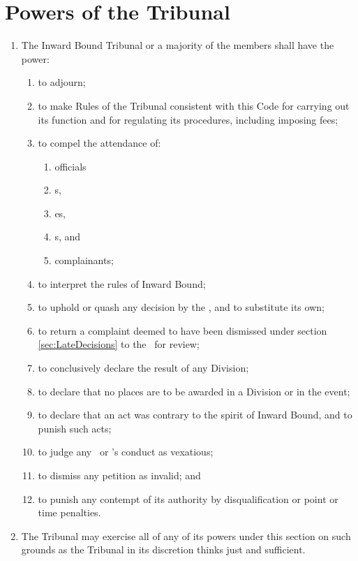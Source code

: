 \documentclass[12pt]{report}
\begin{document}
  \section{Powers of the Tribunal}\label{sec:TribunalPowers}
  \begin{enumerate}
    \item The Inward Bound Tribunal or a majority of the members shall have the power:
    \begin{enumerate}
      \item to adjourn;
      \item to make Rules of the Tribunal consistent with this Code for carrying out its function and for regulating its procedures, including imposing  fees;
      \item to compel the attendance of:
      \begin{enumerate}
        \item officials
        \item \competitor s,
        \item \Captain es,
        \item \President s, and
        \item complainants;
      \end{enumerate}
      \item to interpret the rules of Inward Bound;
      \item to uphold or quash any decision by the \Referee, and to substitute its own;
      \item to return a complaint deemed to have been dismissed under section \ref{sec:LateDecisions} to the \Referee\ for review;
      \item to conclusively declare the result of any Division;
      \item to declare that no places are to be awarded in a Division or in the event;
      \item to declare that an act was contrary to the spirit of Inward Bound, and to punish such acts;
      \item to judge any \Coach\ or \President's conduct as vexatious;
      \item to dismiss any petition as invalid; and
      \item to punish any contempt of its authority by disqualification or point or time penalties.
    \end{enumerate}
    \item The Tribunal may exercise all of any of its powers under this section on such grounds as the Tribunal in its discretion thinks just and sufficient.
  \end{enumerate}
\end{document}
